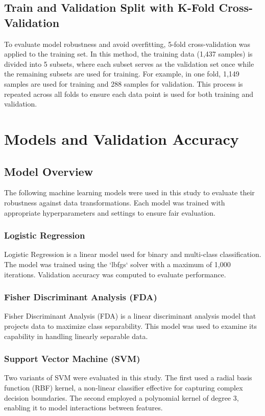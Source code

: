 \documentclass{article}
\begin{document}
\subsection{Train and Validation Split with K-Fold Cross-Validation}
To evaluate model robustness and avoid overfitting, 5-fold cross-validation was applied to the training set. In this method, the training data (1,437 samples) is divided into 5 subsets, where each subset serves as the validation set once while the remaining subsets are used for training. For example, in one fold, 1,149 samples are used for training and 288 samples for validation. This process is repeated across all folds to ensure each data point is used for both training and validation.


\section{Models and Validation Accuracy}

\subsection{Model Overview}
The following machine learning models were used in this study to evaluate their robustness against data transformations. Each model was trained with appropriate hyperparameters and settings to ensure fair evaluation.

\subsubsection{Logistic Regression}
Logistic Regression is a linear model used for binary and multi-class classification. 
The model was trained using the `lbfgs` solver with a maximum of 1,000 iterations. Validation accuracy was computed to evaluate performance.

\subsubsection{Fisher Discriminant Analysis (FDA)}
Fisher Discriminant Analysis (FDA) is a linear discriminant analysis model that projects data to maximize class separability. 
This model was used to examine its capability in handling linearly separable data.

\subsubsection{Support Vector Machine (SVM)}
Two variants of SVM were evaluated in this study. The first used a radial basis function (RBF) kernel, a non-linear classifier effective for capturing complex decision boundaries. The second employed a polynomial kernel of degree 3, enabling it to model interactions between features. 
\end{document}
